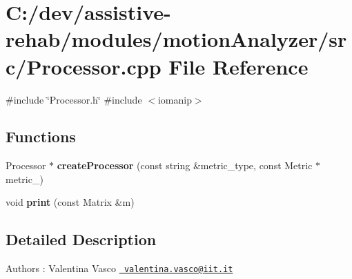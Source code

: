 \section{C\+:/dev/assistive-\/rehab/modules/motion\+Analyzer/src/\+Processor.cpp File Reference}
\label{Processor_8cpp}
{\ttfamily \#include \char`\"{}Processor.\+h\char`\"{}}\newline
{\ttfamily \#include $<$iomanip$>$}\newline
\subsection*{Functions}
\begin{DoxyCompactItemize}
\item 
\mbox{\label{Processor_8cpp_a9f00bd3632d3c6070e667213c2d75aa6}} 
Processor $\ast$ {\bfseries create\+Processor} (const string \&metric\+\_\+type, const Metric $\ast$metric\+\_\+)
\item 
\mbox{\label{Processor_8cpp_a9ed8164d10bb492e02ff6bad278676ee}} 
void {\bfseries print} (const Matrix \&m)
\end{DoxyCompactItemize}


\subsection{Detailed Description}
\begin{DoxyAuthor}{Authors}
\+: Valentina Vasco \href{mailto:valentina.vasco@iit.it}{\texttt{ valentina.\+vasco@iit.\+it}} 
\end{DoxyAuthor}
